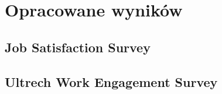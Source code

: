 \section{Opracowane wyników}
\subsection{Job Satisfaction Survey}
\subsection{Ultrech Work Engagement Survey}

